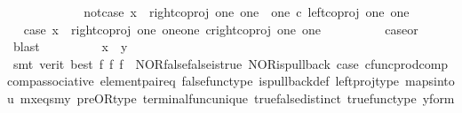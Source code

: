 \begin{isabellebody}
\ \ \ \ \isamarkupfalse%
\isanewline
\ \ \ \ \ \ \isamarkupfalse%
\ not{\isacharunderscore}{\kern0pt}case{}{\isacharcolon}{\kern0pt}\ {\isachardoublequoteopen}x\ {\isasymnoteq}\ right{\isacharunderscore}{\kern0pt}coproj\ one\ {\isacharparenleft}{\kern0pt}one\ {\isasymCoprod}\ one{\isacharparenright}{\kern0pt}\ {\isasymcirc}\isactrlsub c\ left{\isacharunderscore}{\kern0pt}coproj\ one\ one{\isachardoublequoteclose}\isanewline
\ \ \ \ \ \ \isamarkupfalse%
\ \isamarkupfalse%
\ case{}{\isacharcolon}{\kern0pt}\ {\isachardoublequoteopen}x\ {\isacharequal}{\kern0pt}\ right{\isacharunderscore}{\kern0pt}coproj\ one\ {\isacharparenleft}{\kern0pt}one{\isasymCoprod}one{\isacharparenright}{\kern0pt}\ {\isasymcirc}\isactrlsub c{\isacharparenleft}{\kern0pt}right{\isacharunderscore}{\kern0pt}coproj\ one\ one{\isacharparenright}{\kern0pt}{\isachardoublequoteclose}\isanewline
\ \ \ \ \ \ \ \ \isamarkupfalse%
\ case{}{\isacharunderscore}{\kern0pt}or{\isacharunderscore}{\kern0pt}{}\ \isamarkupfalse%
\ blast\isanewline
\ \ \ \ \ \ \isamarkupfalse%
\ \isamarkupfalse%
\ {\isachardoublequoteopen}x\ {\isacharequal}{\kern0pt}\ y{\isachardoublequoteclose}\isanewline
\ \ \ \ \ \ \ \ \isamarkupfalse%
\ {\isacharparenleft}{\kern0pt}smt\ {\isacharparenleft}{\kern0pt}verit{\isacharcomma}{\kern0pt}\ best{\isacharparenright}{\kern0pt}\ f{}\ f{}\ f{}\ \ NOR{\isacharunderscore}{\kern0pt}false{\isacharunderscore}{\kern0pt}false{\isacharunderscore}{\kern0pt}is{\isacharunderscore}{\kern0pt}true\ NOR{\isacharunderscore}{\kern0pt}is{\isacharunderscore}{\kern0pt}pullback\ case{}\ cfunc{\isacharunderscore}{\kern0pt}prod{\isacharunderscore}{\kern0pt}comp\ comp{\isacharunderscore}{\kern0pt}associative{}\ element{\isacharunderscore}{\kern0pt}pair{\isacharunderscore}{\kern0pt}eq\ false{\isacharunderscore}{\kern0pt}func{\isacharunderscore}{\kern0pt}type\ is{\isacharunderscore}{\kern0pt}pullback{\isacharunderscore}{\kern0pt}def\ left{\isacharunderscore}{\kern0pt}proj{\isacharunderscore}{\kern0pt}type\ maps{\isacharunderscore}{\kern0pt}into{\isacharunderscore}{\kern0pt}{}u{}\ mx{\isacharunderscore}{\kern0pt}eqs{\isacharunderscore}{\kern0pt}my\ pre{\isacharunderscore}{\kern0pt}OR{\isacharunderscore}{\kern0pt}type\ terminal{\isacharunderscore}{\kern0pt}func{\isacharunderscore}{\kern0pt}unique\ true{\isacharunderscore}{\kern0pt}false{\isacharunderscore}{\kern0pt}distinct\ true{\isacharunderscore}{\kern0pt}func{\isacharunderscore}{\kern0pt}type\ y{\isacharunderscore}{\kern0pt}form{\isacharparenright}{\kern0pt}\isanewline

\end{isabellebody}
